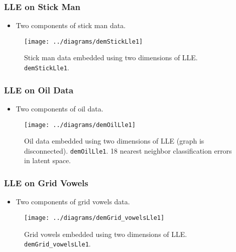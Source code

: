 \subsubsection{LLE on Stick Man}
\begin{itemize}
\item Two components of stick man data.
\end{itemize}
\begin{figure}
  \begin{center}
    \texttt{[image: ../diagrams/demStickLle1]}
    \caption{Stick man data embedded using two dimensions of
      LLE. \texttt{demStickLle1}.}
  \end{center}
\end{figure}



\subsubsection{LLE on Oil Data}

\begin{itemize}
\item Two components of oil data.
\end{itemize}
\begin{figure}
  \begin{center}
    \texttt{[image: ../diagrams/demOilLle1]}
    \caption{Oil data embedded using two dimensions of LLE (graph is
      disconnected). \texttt{demOilLle1}. 18 nearest neighbor
      classification errors in latent space.}
  \end{center}
\end{figure}



\subsubsection{LLE on Grid Vowels}

\begin{itemize}
\item Two components of grid vowels data.
\end{itemize}
\begin{figure}
  \begin{center}
    \texttt{[image: ../diagrams/demGrid\_vowelsLle1]}
    \caption{Grid vowels embedded using two dimensions of
      LLE. \texttt{demGrid\_vowelsLle1}.}
  \end{center}
\end{figure}




